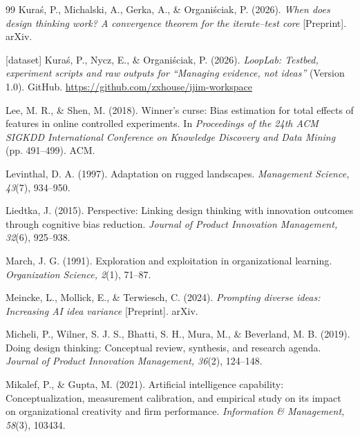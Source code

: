 \begin{thebibliography}{99}
\ifanon\else
{} Kura{\'s}, P., Michalski, A., Gerka, A., \& Organi{\'s}ciak, P. (2026). \textit{When does design thinking work? A convergence theorem for the iterate--test core} [Preprint]. arXiv. 
\fi

\ifanon\else
{} [dataset] Kura{\'s}, P., Nycz, E., \& Organi{\'s}ciak, P. (2026). \textit{LoopLab: Testbed, experiment scripts and raw outputs for ``Managing evidence, not ideas''} (Version 1.0). GitHub. \url{https://github.com/zxhouse/ijim-workspace}
\fi

 Lee, M. R., \& Shen, M. (2018). Winner's curse: Bias estimation for total effects of features in online controlled experiments. In \textit{Proceedings of the 24th ACM SIGKDD International Conference on Knowledge Discovery and Data Mining} (pp. 491--499). ACM. 

 Levinthal, D. A. (1997). Adaptation on rugged landscapes. \textit{Management Science, 43}(7), 934--950. 

 Liedtka, J. (2015). Perspective: Linking design thinking with innovation outcomes through cognitive bias reduction. \textit{Journal of Product Innovation Management, 32}(6), 925--938. 

 March, J. G. (1991). Exploration and exploitation in organizational learning. \textit{Organization Science, 2}(1), 71--87. 

 Meincke, L., Mollick, E., \& Terwiesch, C. (2024). \textit{Prompting diverse ideas: Increasing AI idea variance} [Preprint]. arXiv. 

 Micheli, P., Wilner, S. J. S., Bhatti, S. H., Mura, M., \& Beverland, M. B. (2019). Doing design thinking: Conceptual review, synthesis, and research agenda. \textit{Journal of Product Innovation Management, 36}(2), 124--148. 

 Mikalef, P., \& Gupta, M. (2021). Artificial intelligence capability: Conceptualization, measurement calibration, and empirical study on its impact on organizational creativity and firm performance. \textit{Information \& Management, 58}(3), 103434. 


\end{thebibliography}
